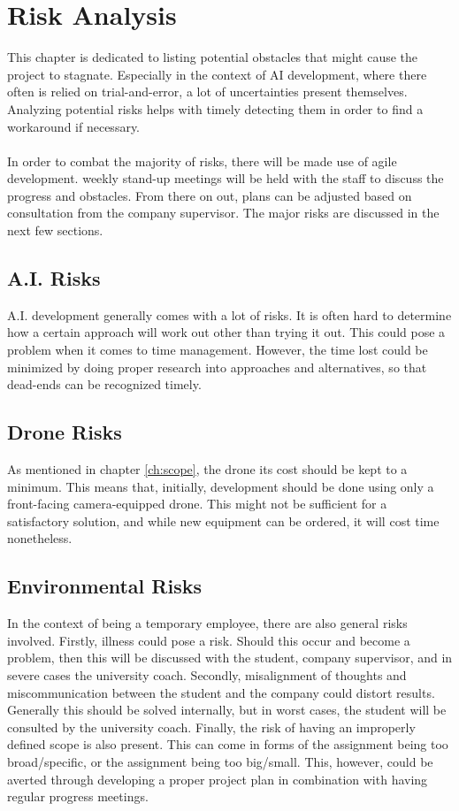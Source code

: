 \chapter{Risk Analysis}
\label{ch:risks}

This chapter is dedicated to listing potential obstacles that might cause the project to stagnate. Especially in the context of \gls{AI} development, where there often is relied on trial-and-error, a lot of uncertainties present themselves. Analyzing potential risks helps with timely detecting them in order to find a workaround if necessary. \\\\
\noindent
In order to combat the majority of risks, there will be made use of agile development. weekly stand-up meetings will be held with the staff to discuss the progress and obstacles. From there on out, plans can be adjusted based on consultation from the company supervisor. The major risks are discussed in the next few sections.

\section{A.I. Risks}
A.I. development generally comes with a lot of risks. It is often hard to determine how a certain approach will work out other than trying it out. This could pose a problem when it comes to time management. However, the time lost could be minimized by doing proper research into approaches and alternatives, so that dead-ends can be recognized timely.

\section{Drone Risks}
As mentioned in chapter \ref{ch:scope}, the drone its cost should be kept to a minimum. This means that, initially, development should be done using only a front-facing camera-equipped drone. This might not be sufficient for a satisfactory solution, and while new equipment can be ordered, it will cost time nonetheless.

\section{Environmental Risks}
In the context of being a temporary employee, there are also general risks involved. Firstly, illness could pose a risk. Should this occur and become a problem, then this will be discussed with the student, company supervisor, and in severe cases the university coach. Secondly, misalignment of thoughts and miscommunication between the student and the company could distort results. Generally this should be solved internally, but in worst cases, the student will be consulted by the university coach. Finally, the risk of having an improperly defined scope is also present. This can come in forms of the assignment being too broad/specific, or the assignment being too big/small. This, however, could be averted through developing a proper project plan in combination with having regular progress meetings.


